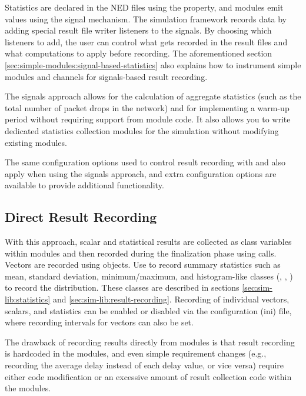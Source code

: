 Statistics are declared in the NED files using the  property,
and modules emit values using the signal mechanism. The simulation framework
records data by adding special result file writer listeners to the signals.
By choosing which listeners to add, the user can control what gets recorded
in the result files and what computations to apply before recording. The aforementioned
section \ref{sec:simple-modules:signal-based-statistics} also explains how to instrument
simple modules and channels for signals-based result recording.

The signals approach allows for the calculation of aggregate statistics (such as the
total number of packet drops in the network) and for implementing a warm-up
period without requiring support from module code. It also allows you to write
dedicated statistics collection modules for the simulation without modifying
existing modules.

The same configuration options used to control result recording
with  and  also apply when using
the signals approach, and extra configuration options are available to
provide additional functionality.

\subsection{Direct Result Recording}
\label{sec:ana-sim:direct-result-recording}

With this approach, scalar and statistical results are collected as class
variables within modules and then recorded during the finalization phase
using  calls. Vectors are recorded using
 objects. Use  to record summary statistics
such as mean, standard deviation, minimum/maximum, and histogram-like classes
(, , ) to
record the distribution. These classes are described in sections
\ref{sec:sim-lib:statistics} and \ref{sec:sim-lib:result-recording}.
Recording of individual vectors, scalars, and statistics can be enabled or
disabled via the configuration (ini) file, where recording intervals for
vectors can also be set.

The drawback of recording results directly from modules is that result
recording is hardcoded in the modules, and even simple requirement changes
(e.g., recording the average delay instead of each delay value, or vice versa)
require either code modification or an excessive amount of result collection
code within the modules.



